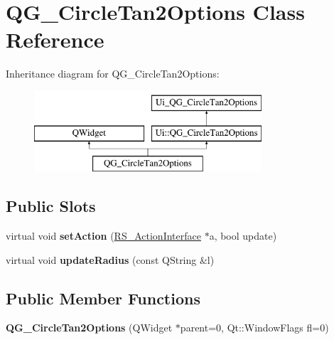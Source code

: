 \hypertarget{classQG__CircleTan2Options}{\section{Q\-G\-\_\-\-Circle\-Tan2\-Options Class Reference}
\label{classQG__CircleTan2Options}
}
Inheritance diagram for Q\-G\-\_\-\-Circle\-Tan2\-Options\-:\begin{figure}[H]
\begin{center}
\leavevmode
\includegraphics[height=3.000000cm]{classQG__CircleTan2Options}
\end{center}
\end{figure}
\subsection*{Public Slots}
\begin{DoxyCompactItemize}
\item 
\hypertarget{classQG__CircleTan2Options_a0a3ab2e80da6cddaa4bd473833beac7a}{virtual void {\bfseries set\-Action} (\hyperlink{classRS__ActionInterface}{R\-S\-\_\-\-Action\-Interface} $\ast$a, bool update)}\label{classQG__CircleTan2Options_a0a3ab2e80da6cddaa4bd473833beac7a}

\item 
\hypertarget{classQG__CircleTan2Options_a502ec2cb9c1bd3f5add352e86fdf554d}{virtual void {\bfseries update\-Radius} (const Q\-String \&l)}\label{classQG__CircleTan2Options_a502ec2cb9c1bd3f5add352e86fdf554d}

\end{DoxyCompactItemize}
\subsection*{Public Member Functions}
\begin{DoxyCompactItemize}
\item 
\hypertarget{classQG__CircleTan2Options_a91b2d674acac3dbccc5bce9e2ad58a1b}{{\bfseries Q\-G\-\_\-\-Circle\-Tan2\-Options} (Q\-Widget $\ast$parent=0, Qt\-::\-Window\-Flags fl=0)}\label{classQG__CircleTan2Options_a91b2d674acac3dbccc5bce9e2ad58a1b}

\end{DoxyCompactItemize}

